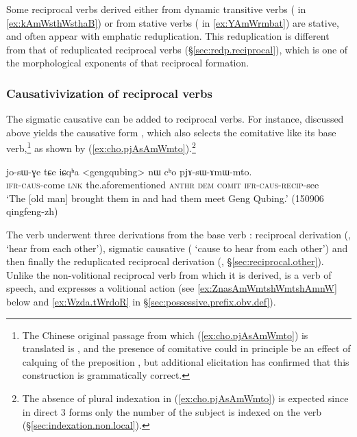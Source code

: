 Some reciprocal verbs derived either from dynamic transitive verbs ( in \ref{ex:kAmWsthWsthaB}) or from stative verbs ( in \ref{ex:YAmWrmbat}) are stative, and often appear with emphatic reduplication. This reduplication is different from that of reduplicated reciprocal verbs (§\ref{sec:redp.reciprocal}), which is one of the morphological exponents of that reciprocal formation.

\subsubsection{Causativivization of  reciprocal verbs} \label{sec:sAmW}
The sigmatic causative can be added to  reciprocal verbs. For instance,  discussed above yields the causative form , which also selects the comitative like its base verb,\footnote{The Chinese original passage from which (\ref{ex:cho.pjAsAmWmto}) is translated is , and the presence of comitative could in principle be an effect of calquing of the preposition , but additional elicitation has confirmed that this construction is grammatically correct. }
 as shown by (\ref{ex:cho.pjAsAmWmto}).\footnote{The absence of plural indexation in (\ref{ex:cho.pjAsAmWmto}) is expected since in direct 3\flobv{} forms only the number of the subject is indexed on the verb (§\ref{sec:indexation.non.local}). }


\begin{exe}
\ex \label{ex:cho.pjAsAmWmto}
\gll jo-sɯ-ɣe tɕe iɕqʰa <gengqubing> nɯ cʰo pjɤ-sɯ-ɤmɯ-mto.  \\
\textsc{ifr}-\textsc{caus}-come \textsc{lnk} the.aforementioned  \textsc{anthr} \textsc{dem} \textsc{comit} \textsc{ifr}-\textsc{caus}-\textsc{recip}-see \\
\glt `The [old man] brought them in and had them meet Geng Qubing.' (150906 qingfeng-zh) 
\end{exe}

The verb  underwent three derivations from the base verb :  reciprocal derivation (, `hear from each other'), sigmatic causative ( `cause to hear from each other') and then finally the reduplicated reciprocal derivation (, §\ref{sec:reciprocal.other}). Unlike the non-volitional reciprocal verb  from which it is derived,  is a verb of speech, and expresses a volitional action (see \ref{ex:ZnasAmWmtshWmtshAmnW} below and \ref{ex:Wzda.tWrdoR} in §\ref{sec:possessive.prefix.obv.def}). 

